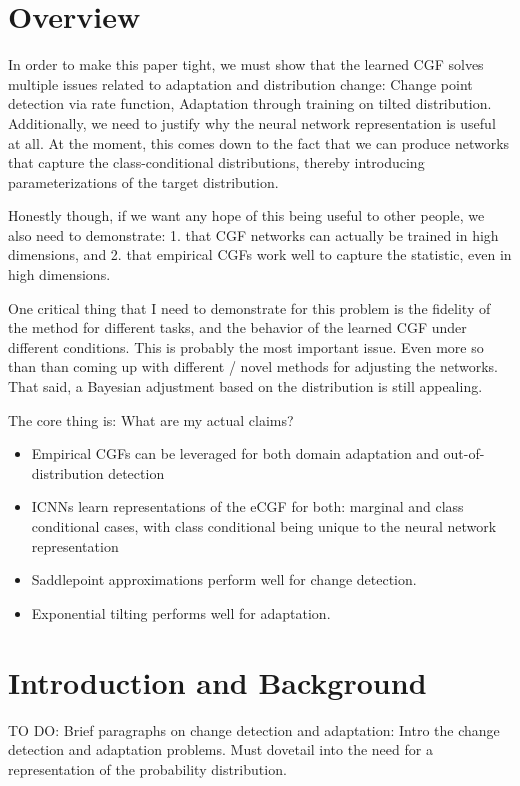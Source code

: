 \documentclass[11pt]{article}      %
\begin{document}
\section{Overview}

In order to make this paper tight, we must show that the learned CGF solves multiple issues related to adaptation and distribution change: Change point detection via rate function, Adaptation through training on tilted distribution.
Additionally, we need to justify why the neural network representation is useful at all.
At the moment, this comes down to the fact that we can produce networks that capture the class-conditional distributions, thereby introducing parameterizations of the target distribution.

Honestly though, if we want any hope of this being useful to other people, we also need to demonstrate: 1. that CGF networks can actually be trained in high dimensions, and 2. that empirical CGFs work well to capture the statistic, even in high dimensions.

One critical thing that I need to demonstrate for this problem is the fidelity of the method for different tasks, and the behavior of the learned CGF under different conditions. 
This is probably the most important issue. Even more so than than coming up with different / novel methods for adjusting the networks. That said, a Bayesian adjustment based on the distribution is still appealing.


The core thing is: What are my actual claims?
\begin{itemize}
  \item Empirical CGFs can be leveraged for both domain adaptation and out-of-distribution detection
  \item ICNNs learn representations of the eCGF for both: marginal and class conditional cases, with class conditional being unique to the neural network representation
  \item Saddlepoint approximations perform well for change detection.
  \item Exponential tilting performs well for adaptation.
\end{itemize}





\section{Introduction and Background}


TO DO: Brief paragraphs on change detection and adaptation: Intro the change detection and adaptation problems.
Must dovetail into the need for a representation of the probability distribution.
\end{document}
